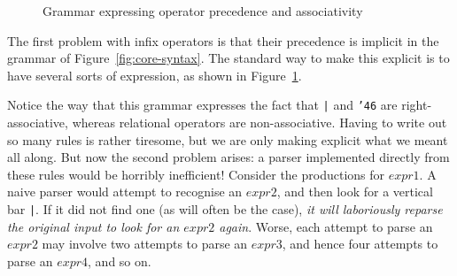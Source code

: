 \begin{figure} %
{}
\caption{Grammar expressing operator precedence and associativity}
\label{fig:op-syntax}
\end{figure}
The first problem with infix operators is that their
precedence is implicit in the grammar
of Figure~\ref{fig:core-syntax}.  The standard
way to make this explicit is to have several sorts of expression, as shown
in Figure~\ref{fig:op-syntax}.

Notice the way that this grammar expresses
the fact that \mbox{\tt |} and \mbox{\tt {\char'46}} are
right-associative, whereas relational operators are non-associative.
Having to write out so many rules is rather tiresome,
but we are only making explicit what we
meant all along.  But now the second problem arises: a parser
implemented directly from these rules would be horribly inefficient!
Consider the productions for $expr1$.  A naive parser would attempt to
recognise an $expr2$, and then look for a vertical bar \mbox{\tt |}.  If it did
not find one (as will often be the case), {\em it will laboriously
reparse the original input to look for an $expr2$ again}.  Worse, each
attempt to parse an $expr2$ may involve two attempts to parse an
$expr3$, and hence four attempts to parse an $expr4$, and so on.

